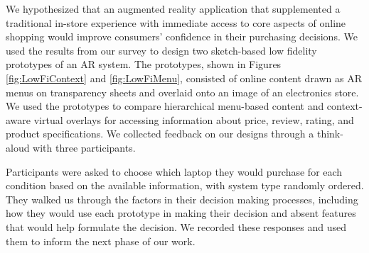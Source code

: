 We hypothesized that an augmented reality application that supplemented a traditional in-store experience with immediate access to core aspects of online shopping would improve consumers' confidence in their purchasing decisions. 
We used the results from our survey to design two sketch-based low fidelity prototypes of an AR system. 
The prototypes, shown in Figures \ref{fig:LowFiContext} and \ref{fig:LowFiMenu}, consisted of online content drawn as AR menus on transparency sheets and overlaid onto an image of an electronics store. 
We used the prototypes to compare hierarchical menu-based content and context-aware virtual overlays for accessing information about price, review, rating, and product specifications. We collected feedback on our designs through a think-aloud with three participants.

Participants were asked to choose which laptop they would purchase for each condition based on the available information, with system type randomly ordered. 
They walked us through the factors in their decision making processes, including how they would use each prototype in making their decision and absent features that would help formulate the decision. We recorded these responses and used them to inform the next phase of our work. 

